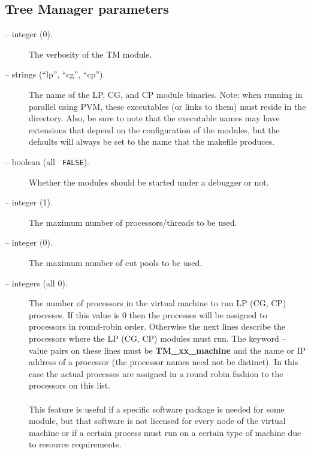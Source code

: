 \subsection{Tree Manager parameters}
\label{tm_params}
\begin{description}

\item[ -- integer (0).] 
The verbosity of the TM module.

\item[ -- strings (``lp'', ``cg'',
``cp'').] 
The name of the LP, CG, and CP module binaries. Note: when running in
parallel using PVM, these executables (or links to them) must reside
in the  directory. Also, be sure to note
that the executable names may have extensions that depend on the
configuration of the modules, but the defaults will always be set to
the name that the makefile produces.

\item[ -- boolean (all {\tt
FALSE}).] 
Whether the modules should be started under a debugger or not.

\item[ -- integer (1).] 
The maximum number of processors/threads to be used.

\item[ -- integer (0).] 
The maximum number of cut pools to be used.

\item[ -- integers
(all 0).] 
The number of processors in the virtual machine to run LP (CG, CP)
processes. If this value is 0 then the processes will be assigned to
processors in round-robin order. Otherwise the next  lines
describe the processors where the LP (CG, CP) modules must run. The
keyword -- value pairs on these lines must be {\bf TM\_xx\_machine} and the
name or IP address of a processor (the processor names need not be distinct).
In this case the actual processes are assigned in a round robin fashion to the
processors on this list.\\
\\
This feature is useful if a specific software package is needed for
some module, but that software is not licensed for every node of the
virtual machine or if a certain process must run on a certain type of
machine due to resource requirements.


\end{description}
